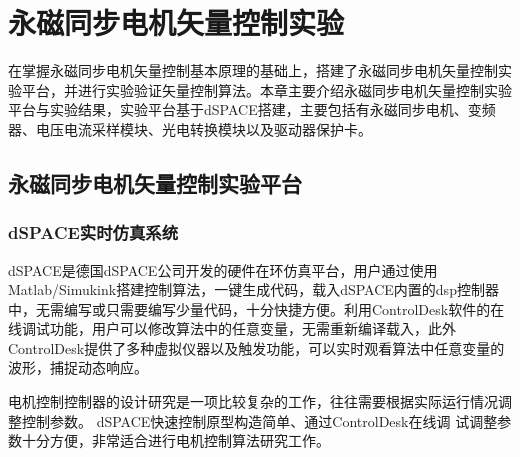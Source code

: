 \chapter{永磁同步电机矢量控制实验}
在掌握永磁同步电机矢量控制基本原理的基础上，搭建了永磁同步电机矢量控制实验平台，并进行实验验证矢量控制算法。本章主要介绍永磁同步电机矢量控制实验平台与实验结果，实验平台基于dSPACE搭建，主要包括有永磁同步电机、变频器、电压电流采样模块、光电转换模块以及驱动器保护卡。
\section{永磁同步电机矢量控制实验平台}

\subsection{dSPACE实时仿真系统}
dSPACE是德国dSPACE公司开发的硬件在环仿真平台，用户通过使用Matlab/Simukink搭建控制算法，一键生成代码，载入dSPACE内置的dsp控制器中，无需编写或只需要编写少量代码，十分快捷方便。利用ControlDesk软件的在线调试功能，用户可以修改算法中的任意变量，无需重新编译载入，此外ControlDesk提供了多种虚拟仪器以及触发功能，可以实时观看算法中任意变量的波形，捕捉动态响应。

电机控制控制器的设计研究是一项比较复杂的工作，往往需要根据实际运行情况调整控制参数。 dSPACE快速控制原型构造简单、通过ControlDesk在线调
试调整参数十分方便，非常适合进行电机控制算法研究工作。
